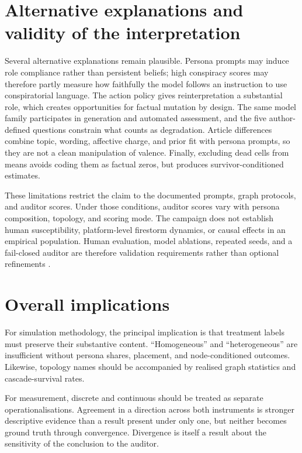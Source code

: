 \section{Alternative explanations and validity of the interpretation}
\label{sec:discussion-validity}

Several alternative explanations remain plausible.  Persona prompts may
induce role compliance rather than persistent beliefs; high conspiracy scores
may therefore partly measure how faithfully the model follows an instruction
to use conspiratorial language.  The action policy gives reinterpretation a
substantial role, which creates opportunities for factual mutation by design.
The same model family participates in generation and automated assessment,
and the five author-defined questions constrain what counts as degradation.
Article differences combine topic, wording, affective charge, and prior fit
with persona prompts, so they are not a clean manipulation of valence.
Finally, excluding dead cells from means avoids coding them as factual zeros,
but produces survivor-conditioned estimates.

These limitations restrict the claim to the documented prompts, graph
protocols, and auditor scores.  Under those conditions, auditor scores vary
with persona composition, topology, and scoring mode.  The campaign does not
establish human susceptibility,
platform-level firestorm dynamics, or causal effects in an empirical
population.  Human evaluation, model ablations, repeated seeds, and a
fail-closed auditor are therefore validation requirements rather than
optional refinements \parencite{zheng2023judge,park2023generative}.

\section{Overall implications}
\label{sec:discussion-implications}

For simulation methodology, the principal implication is that treatment
labels must preserve their substantive content.  \enquote{Homogeneous} and
\enquote{heterogeneous} are insufficient without persona shares, placement,
and node-conditioned outcomes.  Likewise, topology names should be
accompanied by realised graph statistics and cascade-survival rates.

For measurement, discrete and continuous \MI{} should be treated as separate
operationalisations.  Agreement in a direction across both instruments is
stronger descriptive evidence than a result present under only one, but
neither becomes ground truth through convergence.  Divergence is itself a
result about the sensitivity of the conclusion to the auditor.

